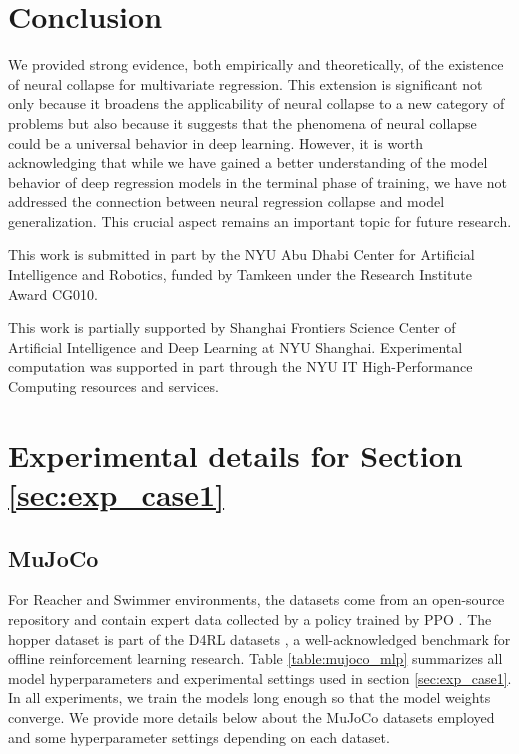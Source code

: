 \documentclass{article}
\theoremstyle{plain}
\theoremstyle{definition}
\theoremstyle{remark}
\begin{document}
 \section{Conclusion}
 \label{sec5}
 We provided strong evidence, both empirically and theoretically, of the existence of neural collapse for multivariate regression. 
 This extension is significant not only because it broadens the applicability of neural collapse to a new category of problems but also because it suggests that the phenomena of neural collapse could be a universal behavior in deep learning.  However, it is worth acknowledging that while we have gained a better understanding of the model behavior of deep regression models in the terminal phase of training, we have not addressed the connection between neural regression collapse and model generalization. This crucial aspect remains an important topic for future research.

\clearpage
\begin{ack}
    This work is submitted in part by the NYU Abu Dhabi Center for Artificial Intelligence and Robotics, funded by Tamkeen under the Research Institute Award CG010.
    
    This work is partially supported by Shanghai Frontiers Science Center of Artificial Intelligence and Deep Learning at NYU Shanghai. Experimental computation was supported in part through the NYU IT High-Performance Computing resources and services.
\end{ack}

{}


\clearpage
\appendix


\section{Experimental details for Section \ref{sec:exp_case1}}
\label{sec:a_exp}

\subsection{MuJoCo}
\label{appendix:mujoco}

For Reacher and Swimmer environments, the datasets come from an open-source repository \citep{gallouedec2024jack} and contain expert data collected by a policy trained by PPO \citep{schulman2017proximal}. The hopper dataset is part of the D4RL datasets \citep{fu2020d4rl}, a well-acknowledged benchmark for offline reinforcement learning research. Table \ref{table:mujoco_mlp} summarizes all model hyperparameters and experimental settings used in section \ref{sec:exp_case1}. In all experiments, we train the models long enough so that the model weights converge. We provide more details below about the MuJoCo datasets employed and some hyperparameter settings depending on each dataset.
\end{document}
